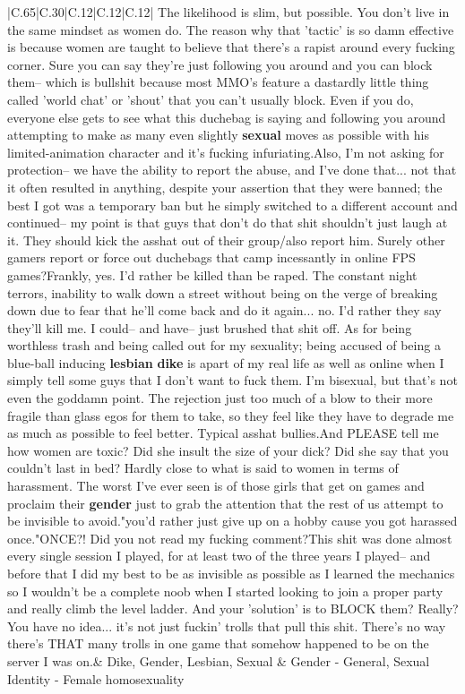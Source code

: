 \documentclass[11pt]{article}
\newlength\mylength
\begin{document}
\begin{center}
\begin{longtable}{|C{.65\mylength}|C{.30\mylength}|C{.12\mylength}|C{.12\mylength}|C{.12\mylength}|}
  \small \@pluubooruu The likelihood is slim, but possible. You don't live in the same mindset as women do. The reason why that 'tactic' is so damn effective is because women are taught to believe that there's a rapist around every fucking corner. Sure you can say they're just following you around and you can block them-- which is bullshit because most MMO's feature a dastardly little thing called 'world chat' or 'shout' that you can't usually block. Even if you do, everyone else gets to see what this duchebag is saying and following you around attempting to make as many even slightly \textbf{sexual} moves as possible with his limited-animation character and it's fucking infuriating.Also, I'm not asking for protection-- we have the ability to report the abuse, and I've done that... not that it often resulted in anything, despite your assertion that they were banned; the best I got was a temporary ban but he simply switched to a different account and continued-- my point is that guys that don't do that shit shouldn't just laugh at it. They should kick the asshat out of their group/also report him. Surely other gamers report or force out duchebags that camp incessantly in online FPS games?Frankly, yes. I'd rather be killed than be raped. The constant night terrors, inability to walk down a street without being on the verge of breaking down due to fear that he'll come back and do it again... no. I'd rather they say they'll kill me. I could-- and have-- just brushed that shit off. As for being worthless trash and being called out for my sexuality; being accused of being a blue-ball inducing \textbf{lesbian} \textbf{dike} is apart of my real life as well as online when I simply tell some guys that I don't want to fuck them. I'm bisexual, but that's not even the goddamn point. The rejection just too much of a blow to their more fragile than glass egos for them to take, so they feel like they have to degrade me as much as possible to feel better. Typical asshat bullies.And PLEASE tell me how women are toxic? Did she insult the size of your dick? Did she say that you couldn't last in bed? Hardly close to what is said to women in terms of harassment. The worst I've ever seen is of those girls that get on games and proclaim their \textbf{gender} just to grab the attention that the rest of us attempt to be invisible to avoid."you'd rather just give up on a hobby cause you got harassed once."ONCE?! Did you not read my fucking comment?This shit was done almost every single session I played, for at least two of the three years I played-- and before that I did my best to be as invisible as possible as I learned the mechanics so I wouldn't be a complete noob when I started looking to join a proper party and really climb the level ladder. And your 'solution' is to BLOCK them? Really? You have no idea... it's not just fuckin' trolls that pull this shit. There's no way there's THAT many trolls in one game that somehow happened to be on the server I was on.\normalsize   & Dike, Gender, Lesbian, Sexual & Gender - General, Sexual Identity - Female homosexuality 
\end{longtable}
\end{center}
\end{document}
